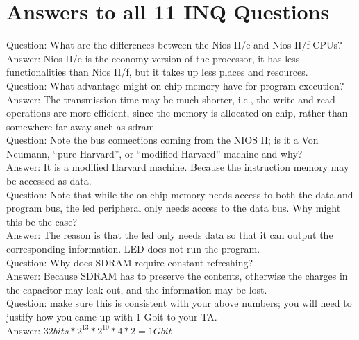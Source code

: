 \documentclass[12pt]{article}
\begin{document}
\section{Answers to all 11 INQ Questions}
Question: What are the differences between the Nios II/e and Nios II/f CPUs? \\

Answer: Nios II/e is the economy version of the processor, it has less functionalities than Nios II/f, but it takes up less places and resources. \\

Question: What advantage might on-chip memory have for program execution? \\

Answer: The transmission time may be much shorter, i.e., the write and read operations are more efficient, since the memory is allocated on chip, rather than somewhere far away such as sdram. \\

Question: Note the bus connections coming from the NIOS II; is it a Von Neumann, “pure Harvard”, or “modified Harvard” machine and why? \\

Answer: It is a modified Harvard machine. Because the instruction memory may be accessed as data. \\

Question: Note that while the on-chip memory needs access to both the data and program bus, the led peripheral only needs access to the data bus. Why might this be the case? \\

Answer: The reason is that the led only needs data so that it can output the corresponding information. LED does not run the program. \\

Question: Why does SDRAM require constant refreshing? \\

Answer: Because SDRAM has to preserve the contents, otherwise the charges in the capacitor may leak out, and the information may be lost. \\

Question: make sure this is consistent with your above numbers; you will need to justify how you came up with 1 Gbit to your TA. \\

Answer: $32 bits * 2^{13} * 2^{10} * 4 * 2 = 1 Gbit$ \\
\end{document}
